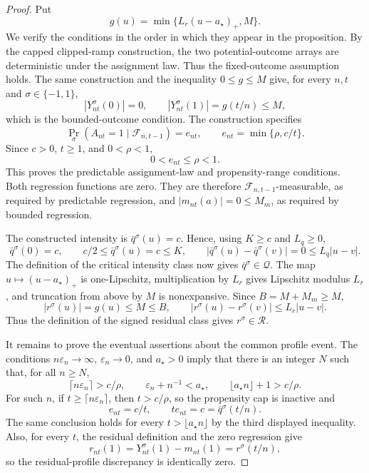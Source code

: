 \documentclass{article}
\begin{document}
\begin{proof}
Put
\[
g(u)=\min\{L_r(u-a_\star)_+,M\}.
\]
We verify the conditions in the order in which they appear in the proposition.  By the capped clipped-ramp construction, the two potential-outcome arrays are deterministic under the assignment law.  Thus the fixed-outcome assumption holds.  The same construction and the inequality \(0\le g\le M\) give, for every \(n,t\) and \(\sigma\in\{-1,1\}\),
\[
 |Y_{nt}^\sigma(0)|=0,
 \qquad
 |Y_{nt}^\sigma(1)|=g(t/n)\le M,
\]
which is the bounded-outcome condition.  The construction specifies
\[
 \Pr_\sigma(A_{nt}=1\mid\mathcal F_{n,t-1})=e_{nt},
 \qquad e_{nt}=\min\{\rho,c/t\}.
\]
Since \(c>0\), \(t\ge1\), and \(0<\rho<1\),
\[
 0<e_{nt}\le\rho<1.
\]
This proves the predictable assignment-law and propensity-range conditions.  Both regression functions are zero.  They are therefore \(\mathcal F_{n,t-1}\)-measurable, as required by predictable regression, and \(|m_{nt}(a)|=0\le M_m\), as required by bounded regression.

The constructed intensity is \(\bar q^\sigma(u)=c\).  Hence, using \(K\ge c\) and \(L_q\ge0\),
\[
 \bar q^\sigma(0)=c,
 \qquad
 c/2\le \bar q^\sigma(u)=c\le K,
 \qquad
 |\bar q^\sigma(u)-\bar q^\sigma(v)|=0\le L_q|u-v|.
\]
The definition of the critical intensity class now gives \(\bar q^\sigma\in\mathcal Q\).  The map \(u\mapsto(u-a_\star)_+\) is one-Lipschitz, multiplication by \(L_r\) gives Lipschitz modulus \(L_r\), and truncation from above by \(M\) is nonexpansive.  Since \(B=M+M_m\ge M\),
\[
 |r^\sigma(u)|=g(u)\le M\le B,
 \qquad
 |r^\sigma(u)-r^\sigma(v)|\le L_r|u-v|.
\]
Thus the definition of the signed residual class gives \(r^\sigma\in\mathcal R\).

It remains to prove the eventual assertions about the common profile event.  The conditions \(n\varepsilon_n\to\infty\), \(\varepsilon_n\to0\), and \(a_\star>0\) imply that there is an integer \(N\) such that, for all \(n\ge N\),
\[
 \lceil n\varepsilon_n\rceil>c/\rho,
 \qquad
 \varepsilon_n+n^{-1}<a_\star,
 \qquad
 \lfloor a_\star n\rfloor+1>c/\rho.
\]
For such \(n\), if \(t\ge\lceil n\varepsilon_n\rceil\), then \(t>c/\rho\), so the propensity cap is inactive and
\[
 e_{nt}=c/t,
 \qquad
 t e_{nt}=c=\bar q^\sigma(t/n).
\]
The same conclusion holds for every \(t>\lfloor a_\star n\rfloor\) by the third displayed inequality.  Also, for every \(t\), the residual definition and the zero regression give
\[
 r_{nt}(1)=Y_{nt}^\sigma(1)-m_{nt}(1)=r^\sigma(t/n),
\]
so the residual-profile discrepancy is identically zero.


\end{proof}
\end{document}
